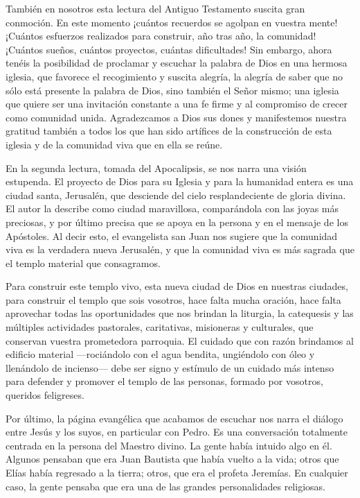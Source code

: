 \begin{body}
					También en nosotros esta lectura del Antiguo Testamento suscita gran conmoción. En este momento ¡cuántos recuerdos se agolpan en vuestra mente! ¡Cuántos esfuerzos realizados para construir, año tras año, la comunidad! ¡Cuántos sueños, cuántos proyectos, cuántas dificultades! Sin embargo, ahora tenéis la posibilidad de proclamar y escuchar la palabra de Dios en una hermosa iglesia, que favorece el recogimiento y suscita alegría, la alegría de saber que no sólo está presente la palabra de Dios, sino también el Señor mismo; una iglesia que quiere ser una invitación constante a una fe firme y al compromiso de crecer como comunidad unida. Agradezcamos a Dios sus dones y manifestemos nuestra gratitud también a todos los que han sido artífices de la construcción de esta iglesia y de la comunidad viva que en ella se reúne.
					
					En la segunda lectura, tomada del Apocalipsis, se nos narra una visión estupenda. El proyecto de Dios para su Iglesia y para la humanidad entera es una ciudad santa, Jerusalén, que desciende del cielo resplandeciente de gloria divina. El autor la describe como ciudad maravillosa, comparándola con las joyas más preciosas, y por último precisa que se apoya en la persona y en el mensaje de los Apóstoles. Al decir esto, el evangelista san Juan nos sugiere que la comunidad viva es la verdadera nueva Jerusalén, y que la comunidad viva es más sagrada que el templo material que consagramos.
					
					Para construir este templo vivo, esta nueva ciudad de Dios en nuestras ciudades, para construir el templo que sois vosotros, hace falta mucha oración, hace falta aprovechar todas las oportunidades que nos brindan la liturgia, la catequesis y las múltiples actividades pastorales, caritativas, misioneras y culturales, que conservan  vuestra prometedora parroquia. El cuidado que con razón brindamos al edificio material ---rociándolo con el agua bendita, ungiéndolo con óleo y llenándolo de incienso--- debe ser signo y estímulo de un cuidado más intenso para defender y promover el templo de las personas, formado por vosotros, queridos feligreses.
					
					Por último, la página evangélica que acabamos de escuchar nos narra el diálogo entre Jesús y los suyos, en particular con Pedro. Es una conversación totalmente centrada en la persona del Maestro divino. La gente había intuido algo en él. Algunos pensaban que era Juan Bautista que había vuelto a la vida; otros que Elías había regresado a la tierra; otros, que era el profeta Jeremías. En cualquier caso, la gente pensaba que era una de las grandes personalidades religiosas.
					

\end{body}
